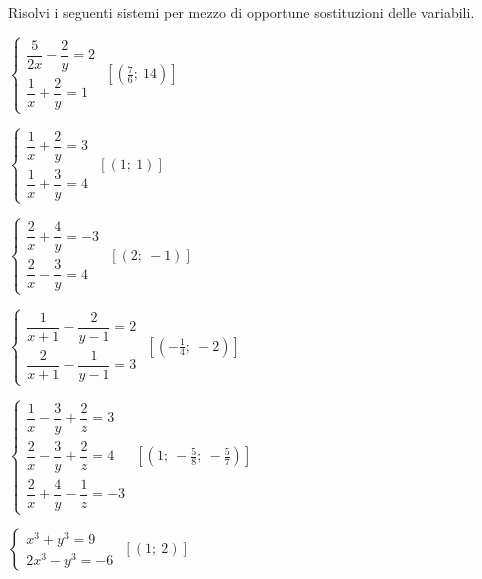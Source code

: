 \begin{esercizio}[*]
 \label{ese:22.65}
 Risolvi i seguenti sistemi per mezzo di opportune sostituzioni delle 
variabili.
\begin{htmulticols}{2}
\begin{enumeratea}
\spazielenx
\item \(\left\{\begin{array}{l}
\dfrac{5}{2x}-\dfrac{2}{y}=2\\\dfrac{1}{x}+\dfrac{2}{y}=1
\end{array}\right.\)
\hfill \(\left[\left(\frac{7}{6};~14\right)\right]\)
\item \(\left\{\begin{array}{l}
\dfrac{1}{x}+\dfrac{2}{y}=3\\\dfrac{1}{x}+\dfrac{3}{y}=4
\end{array}\right.\)
\hfill \(\left[\left(1;~1\right)\right]\)
\item \(\left\{\begin{array}{l}
\dfrac{2}{x}+\dfrac{4}{y}=-3\\\dfrac{2}{x}-\dfrac{3}{y}=4 
\end{array}\right.\)
\hfill \(\left[\left(2;~-1\right)\right]\)
\item \(\left\{\begin{array}{l}
\dfrac{1}{x+1}-\dfrac{2}{y-1}=2\\\dfrac{2}{x+1}-\dfrac{1}{y-1}=3
\end{array}\right.\)
\hfill \(\left[\left(-{\frac{1}{4}};~-2\right)\right]\)
% 
\item \(\left\{\begin{array}{l}
\dfrac{1}{x}-\dfrac{3}{y}+\dfrac{2}{z}=3 \\
\dfrac{2}{x}-\dfrac{3}{y}+\dfrac{2}{z}=4 \\
\dfrac{2}{x}+\dfrac{4}{y}-\dfrac{1}{z}=-3
\end{array}\right.\)
\hfill \(\left[\left(1;~-\frac{5}{8};~-\frac{5}{7}\right)\right]\)
\item \(\left\{\begin{array}{l}
x^{3}+y^{3}=9 \\2x^{3}-y^{3}=-6 
\end{array}\right.\)
\hfill \(\left[(1;~2)\right]\)
\end{enumeratea}
\end{htmulticols}
\end{esercizio}

